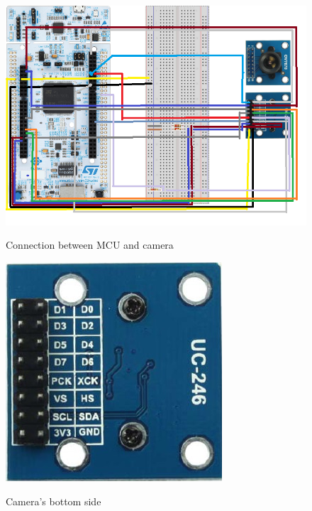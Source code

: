 \begin{figure}[H]
\centering
\includegraphics[scale=.9]{Immagini/10}
\label{10}
\caption{Connection between MCU and camera}
\end{figure}

\begin{figure}[H]
\centering
\includegraphics{Immagini/11}
\label{11}
\caption{Camera's bottom side}
\end{figure}

